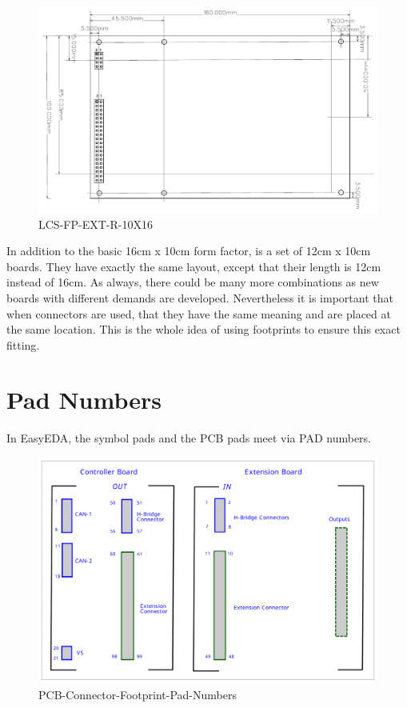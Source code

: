 \begin{figure}[htbp]
    \centering
    \includegraphics[page=1, scale=0.7]{./Figures/LCS-FP-EXT-L-10X16.pdf}
    \caption{LCS-FP-EXT-R-10X16}
\end{figure}

\FloatBarrier

In addition to the basic 16cm x 10cm form factor, is a set of 12cm x 10cm boards. They have exactly the same layout, except that their length is 12cm instead of 16cm. As always, there could be many more combinations as new boards with different demands are developed. Nevertheless it is important that when connectors are used, that they have the same meaning and are placed at the same location. This is the whole idea of using footprints to ensure this exact fitting.

\section{Pad Numbers}

In EasyEDA, the symbol pads and the PCB pads meet via PAD numbers. 

\begin{figure}[htbp]
    \centering
    \includegraphics[page=1, scale=0.4]{./Figures/PCB-Connector-Footprint-Pad-Numbers.pdf}
    \caption{PCB-Connector-Footprint-Pad-Numbers}
\end{figure}

